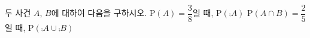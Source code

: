 두 사건 $A$, $B$에 대하여 다음을 구하시오.
 $\mathrm{P}(A)=\dfrac{3}{8}$일 때, $\mathrm{P}(\comp{A})$
 $\mathrm{P}(A\cap B)=\dfrac{2}{5}$일 때, $\mathrm{P}(\comp{A}\cup\comp{B})$
